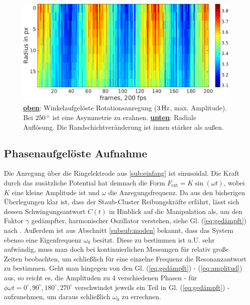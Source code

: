 \documentclass[numbers=noenddot,a4paper]{scrartcl}
\newcommand{\degree}{^\circ}
\newcommand{\ix}[1]{_\text{#1}}
\newcommand{\fett}[1]{\textbf{#1}}
\begin{document}
        \vspace{-0.5cm}

            \begin{figure}[H]
                    \centering
                    \includegraphics[width=\textwidth,height=0.3\textheight]{figs/glowbeispielrotation3Hzrad.png}
                    \caption{\underline{\fett{oben}}: Winkelaufgelöste Rotationsanregung ($\unit[3]{Hz}$, max. Amplitude). Bei $\unit[250]{\degree}$ ist eine Asymmetrie zu erahnen. \underline{\fett{unten}}: Radiale Auflösung. Die Randschichtveränderung ist innen stärker als außen.}
                    \label{img:glowanalys}
            \end{figure}
            
		\subsection{Phasenaufgelöste Aufnahme}

			Die Anregung über die Ringelektrode aus \ref{sub:einfang} ist sinusoidal. Die Kraft durch das zusätzliche Potential hat demnach die Form $F\ix{ext}=K\sin\left(\omega t\right)$, wobei $K$ eine kleine Amplitude ist und $\omega$ die Anregungsfrequenz. Da aus den bisherigen Überlegungen klar ist, dass der Staub-Cluster Reibungskräfte erfährt, lässt sich dessen Schwingungsantwort $C\left(t\right)$ in Hinblick auf die Manipulation als, um den Faktor $\gamma$ gedämpfter, harmonischer Oszillator verstehen, siehe Gl. (\ref{eq:gedämpft}) nach \cite{Carstensen11}. Außerdem ist aus Abschnitt \ref{subsub:moden} bekannt, dass das System ebenso eine Eigenfrequenz $\omega\ix{0}$ besitzt. Diese zu bestimmen ist u.U. sehr aufwändig, muss man doch bei kontinuierlichen Messungen für relativ große Zeiten beobachten, um schließlich für eine einzelne Frequenz die Resonanzantwort zu bestimmen. Geht man hingegen von den Gl. (\ref{eq:gedämpft}) - (\ref{eq:amplitud}) aus, so reicht es, die Amplituden zu 4 verschiedenen Phasen - für $\phi\omega t=0\degree,90\degree,180\degree,270\degree$ verschwindet jeweils ein Teil in Gl. (\ref{eq:gedämpft}) - aufzunehmen, um daraus schließlich $\omega\ix{0}$ zu errechnen.
\end{document}
